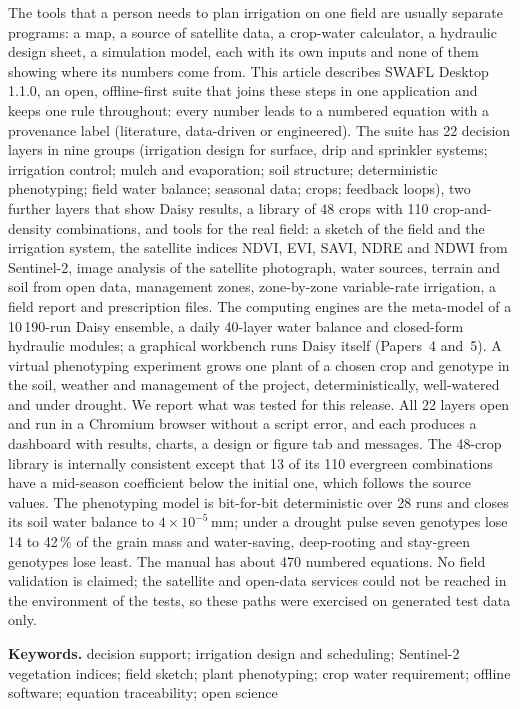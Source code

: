 \begin{titlepage}
{\noindent The tools that a person needs to plan irrigation on one field are usually separate programs: a map, a source of satellite data, a crop-water calculator, a hydraulic design sheet, a simulation model, each with its own inputs and none of them showing where its numbers come from. This article describes SWAFL Desktop 1.1.0, an open, offline-first suite that joins these steps in one application and keeps one rule throughout: every number leads to a numbered equation with a provenance label (literature, data-driven or engineered). The suite has 22 decision layers in nine groups (irrigation design for surface, drip and sprinkler systems; irrigation control; mulch and evaporation; soil structure; deterministic phenotyping; field water balance; seasonal data; crops; feedback loops), two further layers that show Daisy results, a library of 48 crops with 110 crop-and-density combinations, and tools for the real field: a sketch of the field and the irrigation system, the satellite indices NDVI, EVI, SAVI, NDRE and NDWI from Sentinel-2, image analysis of the satellite photograph, water sources, terrain and soil from open data, management zones, zone-by-zone variable-rate irrigation, a field report and prescription files. The computing engines are the meta-model of a 10\,190-run Daisy ensemble, a daily 40-layer water balance and closed-form hydraulic modules; a graphical workbench runs Daisy itself (Papers~4 and~5). A virtual phenotyping experiment grows one plant of a chosen crop and genotype in the soil, weather and management of the project, deterministically, well-watered and under drought. We report what was tested for this release. All 22 layers open and run in a Chromium browser without a script error, and each produces a dashboard with results, charts, a design or figure tab and messages. The 48-crop library is internally consistent except that 13 of its 110 evergreen combinations have a mid-season coefficient below the initial one, which follows the source values. The phenotyping model is bit-for-bit deterministic over 28 runs and closes its soil water balance to $4\times10^{-5}$\,mm; under a drought pulse seven genotypes lose 14 to 42\,\% of the grain mass and water-saving, deep-rooting and stay-green genotypes lose least. The manual has about 470 numbered equations. No field validation is claimed; the satellite and open-data services could not be reached in the environment of the tests, so these paths were exercised on generated test data only.

\medskip\noindent \textbf{Keywords.} decision support; irrigation design and scheduling; Sentinel-2 vegetation indices; field sketch; plant phenotyping; crop water requirement; offline software; equation traceability; open science\par}
\end{titlepage}

